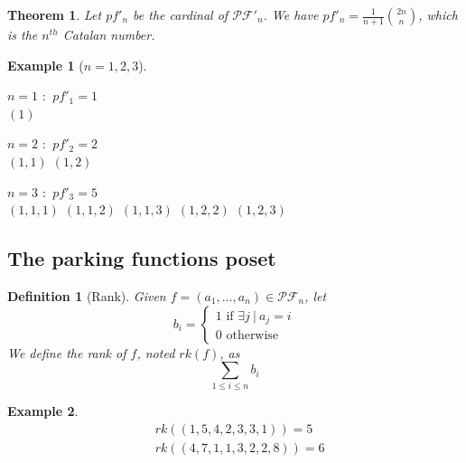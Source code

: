 \documentclass[12pt]{report}
\newtheorem{theorem}{Theorem}
\newtheorem{definition}{Definition}
\newtheorem*{example}{Example}
\begin{document}
\begin{theorem}
    Let $pf'_n$ be the cardinal of $\mathcal{PF'}_n$.
    We have $pf'_n = \frac{1}{n + 1} \binom{2n}{n}$,
    which is the $n^{th}$ Catalan number.
\end{theorem}

\begin{example}[$n = 1, 2, 3$]
    \text{}\\
    \begin{itemize*}
        \item $n = 1$ \text{ } $:$ \text{ } $pf'_1 = 1$\\
        \subitem $(1)$\\
        \item $n = 2$ \text{ } $:$ \text{ } $pf'_2 = 2$\\
        \subitem $(1, 1)$
        \subitem $(1, 2)$\\
        \item $n = 3$ \text{ } $:$ \text{ } $pf'_3 = 5$\\
        \subitem $(1, 1, 1)$
        \subitem $(1, 1, 2)$
        \subitem $(1, 1, 3)$
        \subitem $(1, 2, 2)$
        \subitem $(1, 2, 3)$\\
    \end{itemize*}
\end{example}

\subsection{The parking functions poset}

\begin{definition}[Rank]
    Given $f = (a_1, \ldots, a_n) \in \mathcal{PF}_n$, let
    $$b_i =
    \begin{cases}
        1 \text{ if } \exists j\ |\ a_j = i\\
        0 \text{ otherwise}
    \end{cases} $$
    We define the \emph{rank} of $f$, noted $rk(f)$, as
    $$\sum_{1 \leq i \leq n}{b_i}$$
\end{definition}

\begin{example}
    \begin{align*}
        &rk((1, 5, 4, 2, 3, 3, 1)) = 5\\
        &rk((4, 7, 1, 1, 3, 2 ,2, 8)) = 6\\
    \end{align*}
\end{example}
\end{document}
